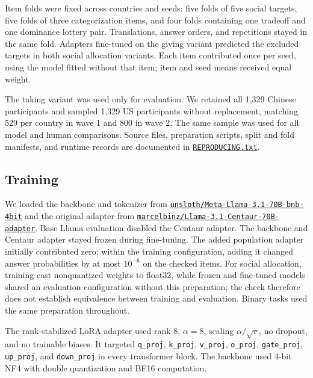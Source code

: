 Item folds were fixed across countries and seeds: five folds of five social targets, five folds of three categorization items, and four folds containing one tradeoff and one dominance lottery pair. Translations, answer orders, and repetitions stayed in the same fold. Adapters fine-tuned on the giving variant predicted the excluded targets in both social allocation variants. Each item contributed once per seed, using the model fitted without that item; item and seed means received equal weight.

The taking variant was used only for evaluation. We retained all 1,329 Chinese participants and sampled 1,329 US participants without replacement, matching 529 per country in wave 1 and 800 in wave 2. The same sample was used for all model and human comparisons. Source files, preparation scripts, split and fold manifests, and runtime records are documented in \href{https://github.com/efeichhorn/culture-bias-centaur/blob/main/REPRODUCING.txt}{\texttt{REPRODUCING.txt}}.

\subsection{Training}

We loaded the backbone and tokenizer from \href{https://huggingface.co/unsloth/Meta-Llama-3.1-70B-bnb-4bit}{\nolinkurl{unsloth/Meta-Llama-3.1-70B-bnb-4bit}} and the original adapter from \href{https://huggingface.co/marcelbinz/Llama-3.1-Centaur-70B-adapter}{\nolinkurl{marcelbinz/Llama-3.1-Centaur-70B-adapter}}. Base Llama evaluation disabled the Centaur adapter. The backbone and Centaur adapter stayed frozen during fine-tuning. The added population adapter initially contributed zero; within the training configuration, adding it changed answer probabilities by at most $10^{-6}$ on the checked items. For social allocation, training cast nonquantized weights to float32, while frozen and fine-tuned models shared an evaluation configuration without this preparation; the check therefore does not establish equivalence between training and evaluation. Binary tasks used the same preparation throughout.

The rank-stabilized LoRA adapter used rank 8, $\alpha=8$, scaling $\alpha/\sqrt{r}$, no dropout, and no trainable biases. It targeted \texttt{q\_proj}, \texttt{k\_proj}, \texttt{v\_proj}, \texttt{o\_proj}, \texttt{gate\_proj}, \texttt{up\_proj}, and \texttt{down\_proj} in every transformer block. The backbone used 4-bit NF4 with double quantization and BF16 computation.

